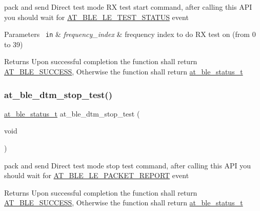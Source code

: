 pack and send Direct test mode RX test start command, after calling this A\+PI you should wait for \mbox{\hyperlink{at__ble__api_8h_a3324640b95f33169515f89738ed5baeba1dfeb2b9d9a9ceae264ac9eceae01f56}{A\+T\+\_\+\+B\+L\+E\+\_\+\+L\+E\+\_\+\+T\+E\+S\+T\+\_\+\+S\+T\+A\+T\+US}} event 


\begin{DoxyParams}[1]{Parameters}
\mbox{\texttt{ in}}  & {\em frequency\+\_\+index} & frequency index to do RX test on (from 0 to 39)\\
\hline
\end{DoxyParams}
\begin{DoxyReturn}{Returns}
Upon successful completion the function shall return \mbox{\hyperlink{group__error__codes__group_gga3b1db9b95feb157b3c188ca27fe76988a7e3bfff5387331cd4f2c56cbcbbd7e19}{A\+T\+\_\+\+B\+L\+E\+\_\+\+S\+U\+C\+C\+E\+SS}}, Otherwise the function shall return \mbox{\hyperlink{at__ble__api_8h_ace24eb4e5ca3f325c663b809da5feb92}{at\+\_\+ble\+\_\+status\+\_\+t}} 
\end{DoxyReturn}
\mbox{\label{group__dtm__group_gafa12d16c45ae0e5efc01beba4772ab69}} 
\subsubsection{\texorpdfstring{at\_ble\_dtm\_stop\_test()}{at\_ble\_dtm\_stop\_test()}}
{\footnotesize\ttfamily \mbox{\hyperlink{group__error__codes__group_ga3b1db9b95feb157b3c188ca27fe76988}{at\+\_\+ble\+\_\+status\+\_\+t}} at\+\_\+ble\+\_\+dtm\+\_\+stop\+\_\+test (\begin{DoxyParamCaption}\item[{void}]{ }\end{DoxyParamCaption})}



pack and send Direct test mode stop test command, after calling this A\+PI you should wait for \mbox{\hyperlink{at__ble__api_8h_a3324640b95f33169515f89738ed5baebad529dc56000832da6054a10c8689d099}{A\+T\+\_\+\+B\+L\+E\+\_\+\+L\+E\+\_\+\+P\+A\+C\+K\+E\+T\+\_\+\+R\+E\+P\+O\+RT}} event 

\begin{DoxyReturn}{Returns}
Upon successful completion the function shall return \mbox{\hyperlink{group__error__codes__group_gga3b1db9b95feb157b3c188ca27fe76988a7e3bfff5387331cd4f2c56cbcbbd7e19}{A\+T\+\_\+\+B\+L\+E\+\_\+\+S\+U\+C\+C\+E\+SS}}, Otherwise the function shall return \mbox{\hyperlink{at__ble__api_8h_ace24eb4e5ca3f325c663b809da5feb92}{at\+\_\+ble\+\_\+status\+\_\+t}} 
\end{DoxyReturn}
\mbox{\label{group__dtm__group_ga6d836e42fe4af24071a8d9191555bb85}} 
